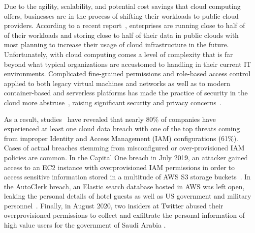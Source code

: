 Due to the agility, scalability, and potential cost savings that
cloud computing offers, businesses are in the process of shifting their workloads
to public cloud providers. According to a recent report~\cite{Flexera2020}, enterprises are running close to half of of their workloads and storing close to half of their data in public clouds with most planning to increase their usage of cloud infrastructure in the future.
Unfortunately, with cloud computing comes a level of complexity that is far beyond what
typical organizations are accustomed to handling in their current IT environments.
Complicated fine-grained permissions and role-based access control applied to both legacy 
virtual machines and networks as well as to modern container-based and serverless platforms has 
made the practice of security in the cloud more abstruse~\cite{Sharrm}, raising significant
security and privacy concerns~\cite{Takabi2010}.

As a result, studies~\cite{Ermetic2020,IBMSecurity2020} have revealed that nearly 80\% of companies have experienced at least one cloud data breach with one of the top threats
coming from improper Identity and Access Management (IAM) configurations (61\%).
Cases of actual breaches stemming from misconfigured or over-provisioned IAM
policies are common.
In the Capital One breach in July 2019, an attacker gained access to an EC2 instance with
overprovisioned IAM permissions in order to access sensitive information stored in a multitude
of AWS S3 storage buckets~\cite{Parimi2019}. 
In the AutoClerk breach, an Elastic search database hosted in AWS was left open, leaking
the personal details of hotel guests as well as US government and military
personnel~\cite{Fawkes2020}.
Finally, in August 2020, two insiders at Twitter abused their overprovisioned permissions to
collect and exfiltrate the personal information of high value users for the 
government of Saudi Arabia \cite{Newman2019}.

